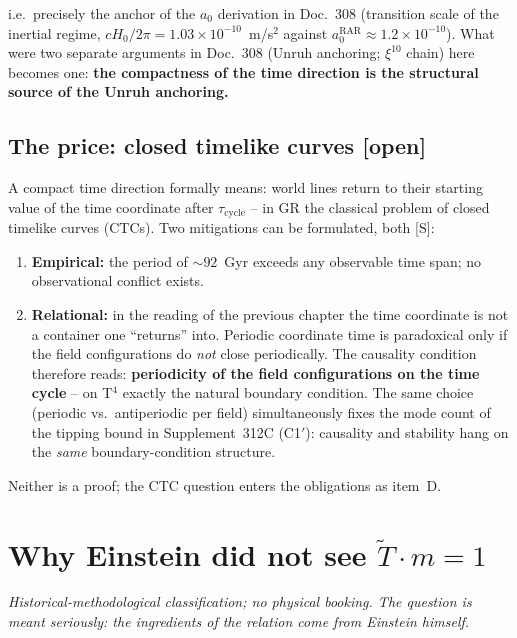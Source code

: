 \documentclass[11pt]{report}
\begin{document}
i.e.\ precisely the anchor of the $a_0$ derivation in Doc.~308
(transition scale of the inertial regime, $cH_0/2\pi
= 1.03\times10^{-10}$~m/s$^2$ against
$a_0^\text{RAR} \approx 1.2\times10^{-10}$). What were two separate
arguments in Doc.~308 (Unruh anchoring; $\xi^{10}$ chain) here
becomes one: \textbf{the compactness of the time direction is the
structural source of the Unruh anchoring.}

\section{The price: closed timelike curves [open]}

A compact time direction formally means: world lines return to
their starting value of the time coordinate after
$\tau_\text{cycle}$ -- in GR the classical problem of closed
timelike curves (CTCs). Two mitigations can be formulated, both
[S]:

\begin{enumerate}
  \item \textbf{Empirical:} the period of $\sim 92$~Gyr exceeds any
        observable time span; no observational conflict exists.
  \item \textbf{Relational:} in the reading of the previous
        chapter the time coordinate is not a container one
        \enquote{returns} into. Periodic coordinate time is
        paradoxical only if the field configurations do \emph{not}
        close periodically. The causality condition therefore
        reads: \textbf{periodicity of the field configurations on
        the time cycle} -- on T$^4$ exactly the natural boundary
        condition. The same choice (periodic vs.\ antiperiodic per
        field) simultaneously fixes the mode count of the tipping
        bound in Supplement~312C (C1$'$): causality and stability
        hang on the \emph{same} boundary-condition structure.
\end{enumerate}

Neither is a proof; the CTC question enters the obligations as
item~D.

\chapter{Why Einstein did not see $\tilde T \cdot m = 1$}

\emph{Historical-methodological classification; no physical
booking. The question is meant seriously: the ingredients of the
relation come from Einstein himself.}
\end{document}
